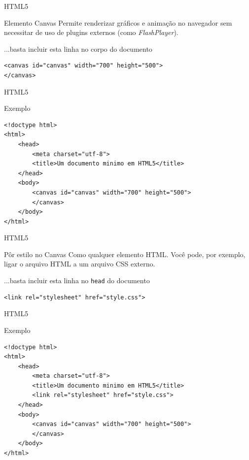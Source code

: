 \documentclass[xcolor=dvipsnames,table]{beamer}
\begin{document}
\begin{frame}[fragile]{HTML5}
	\begin{block}{Elemento Canvas}
		Permite renderizar gráficos e animação no navegador sem necessitar de uso de plugins externos (como {\it FlashPlayer}).
	\end{block} 
		\begin{block}{...basta incluir esta linha no corpo do documento}
			\begin{lstlisting}
<canvas id="canvas" width="700" height="500">
</canvas>
\end{lstlisting}
		\end{block}
\end{frame}

\begin{frame}[fragile]{HTML5}
	\begin{block}{Exemplo}
		\begin{lstlisting}
<!doctype html>
<html>
	<head>
		<meta charset="utf-8">
		<title>Um documento minimo em HTML5</title>
	</head>
	<body>
		<canvas id="canvas" width="700" height="500">
		</canvas>
	</body>
</html>
\end{lstlisting}
		\end{block}
\end{frame}

\begin{frame}[fragile]{HTML5}
	\begin{block}{Pôr estilo no Canvas}
		Como qualquer elemento HTML. Você pode, por exemplo, ligar o arquivo HTML a um arquivo CSS externo.
	\end{block}
	\begin{block}{...basta incluir esta linha no {\tt head} do documento}
			\begin{lstlisting}
<link rel="stylesheet" href="style.css">
\end{lstlisting}
	\end{block}
\end{frame}

\begin{frame}[fragile]{HTML5}
	\begin{block}{Exemplo}
		\begin{lstlisting}
<!doctype html>
<html>
	<head>
		<meta charset="utf-8">
		<title>Um documento minimo em HTML5</title>
		<link rel="stylesheet" href="style.css">
	</head>
	<body>
		<canvas id="canvas" width="700" height="500">
		</canvas>
	</body>
</html>
\end{lstlisting}
		\end{block}
\end{frame}
\end{document}
